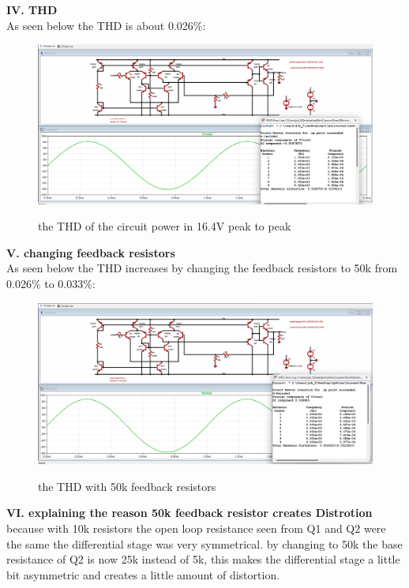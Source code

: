 \documentclass[11pt]{article}
\begin{document}
\textbf{IV. THD}\\
As seen below the THD is about 0.026\%: \\
\begin{figure}[H]
    \begin{center}
        \includegraphics[scale=0.45]{Fig/THD.png}
        \label{fig:THD}
        \caption{the THD of the circuit power in 16.4V peak to peak}
    \end{center}
\end{figure}

\textbf{V. changing feedback resistors}\\
As seen below the THD increases by changing the feedback resistors to 50k
from 0.026\% to 0.033\%: \\
\begin{figure}[H]
    \begin{center}
        \includegraphics[scale=0.45]{Fig/50kdistortion.png}
        \label{fig:distortion50k}
        \caption{the THD with 50k feedback resistors}
    \end{center}
\end{figure}

\textbf{VI. explaining the reason 50k feedback resistor creates Distrotion} \\
because with 10k resistors the open loop resistance seen from Q1 and Q2 were the same
the differential stage was very symmetrical. by changing to 50k the base resistance of
Q2 is now 25k instead of 5k, this makes the differential stage a little bit asymmetric
and creates a little amount of distortion.\\
\end{document}
